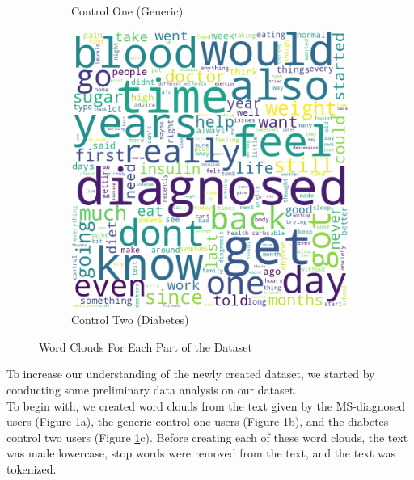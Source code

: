 \documentclass[11pt,a4paper]{article}
\begin{document}
\begin{figure}[h!]
\begin{subfigure}[b]{0.3\linewidth}
    \caption{Control One (Generic)}
  \end{subfigure}
  \hspace{1em}
  \begin{subfigure}[b]{0.3\linewidth}
    \includegraphics[width=\linewidth]{controltwofinal.png}
    \caption{Control Two (Diabetes)}
  \end{subfigure}
  \caption{Word Clouds For Each Part of the Dataset}
  \label{fig:wordclouds}
\end{figure}
To increase our understanding of the newly created dataset, we started by conducting some preliminary data analysis on our dataset. \\
\indent To begin with, we created word clouds from the text given by the MS-diagnosed users (Figure \ref{fig:wordclouds}a), the generic control one users (Figure \ref{fig:wordclouds}b), and the diabetes control two users (Figure \ref{fig:wordclouds}c).  Before creating each of these word clouds, the text was made lowercase, stop words were removed from the text, and the text was tokenized. \\
\end{document}

